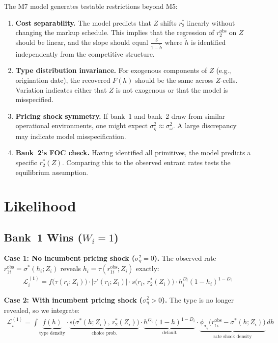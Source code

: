 \documentclass[12pt]{article}
\theoremstyle{plain}
\theoremstyle{plain}
\theoremstyle{definition}  %
\theoremstyle{remark}  %
\begin{document}
The M7 model generates testable restrictions beyond M5:
\begin{enumerate}
    \item \textbf{Cost separability.} The model predicts that $Z$ shifts $r_2^*$ linearly without changing the markup schedule. This implies that the regression of $r_2^{\text{obs}}$ on $Z$ should be linear, and the slope should equal $\frac{\delta}{1-\tilde{h}}$ where $\tilde{h}$ is identified independently from the competitive structure.
    \item \textbf{Type distribution invariance.} For exogenous components of $Z$ (e.g., origination date), the recovered $F(h)$ should be the same across $Z$-cells. Variation indicates either that $Z$ is not exogenous or that the model is misspecified.
    \item \textbf{Pricing shock symmetry.} If bank~1 and bank~2 draw from similar operational environments, one might expect $\sigma_\eta^2 \approx \sigma_\omega^2$. A large discrepancy may indicate model misspecification.
    \item \textbf{Bank~2's FOC check.} Having identified all primitives, the model predicts a specific $r_2^*(Z)$. Comparing this to the observed entrant rates tests the equilibrium assumption.
\end{enumerate}



\section{Likelihood}\label{sec:likelihood}

\subsection{Bank~1 Wins ($W_i = 1$)}

\textbf{Case 1: No incumbent pricing shock ($\sigma_\eta^2 = 0$).} The observed rate $r_{1i}^{\text{obs}} = \sigma^*(h_i; Z_i)$ reveals $h_i = \tau(r_{1i}^{\text{obs}}; Z_i)$ exactly:
\begin{align}\label{eq:L1_noshock}
    \mathcal{L}_i^{(1)} = f\!\big(\tau(r_i; Z_i)\big) \cdot |\tau'(r_i; Z_i)| \cdot s\!\big(r_i,\, r_2^*(Z_i)\big) \cdot h_i^{D_i}(1-h_i)^{1-D_i}
\end{align}

\textbf{Case 2: With incumbent pricing shock ($\sigma_\eta^2 > 0$).} The type is no longer revealed, so we integrate:
\begin{align}\label{eq:L1_het}
    \mathcal{L}_i^{(1)} = \int \underbrace{f(h)}_{\text{type density}} \cdot \underbrace{s\!\big(\sigma^*(h; Z_i),\, r_2^*(Z_i)\big)}_{\text{choice prob.}} \cdot \underbrace{h^{D_i}(1-h)^{1-D_i}}_{\text{default}} \cdot \underbrace{\phi_{\sigma_\eta}\!\big(r_{1i}^{\text{obs}} - \sigma^*(h; Z_i)\big)}_{\text{rate shock density}} \, dh
\end{align}
\end{document}
